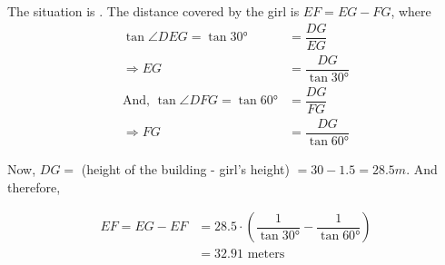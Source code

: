 \begin{solution}[\halfpage]
	The situation is \asif. The distance covered by the girl is $EF = EG - FG$, where
	\begin{align}
		\tan\angle{DEG} = \tan\ang{30} &= \dfrac{DG}{EG} \\
		\Rightarrow EG &= \dfrac{DG}{\tan\ang{30}} \\
		\text{And, }\tan\angle{DFG} = \tan\ang{60} &= \dfrac{DG}{FG} \\
		\Rightarrow FG &= \dfrac{DG}{\tan\ang{60}}
	\end{align}
	
	Now, $DG =$ (height of the building - girl's height) $= 30 - 1.5 = 28.5m$. And therefore, 
	
	\begin{align}
		EF = EG - EF &= 28.5\cdot\left(\dfrac{1}{\tan\ang{30}} - \dfrac{1}{\tan\ang{60}}\right) \\
		&= 32.91 \text{ meters}
	\end{align}
	
\end{solution}

